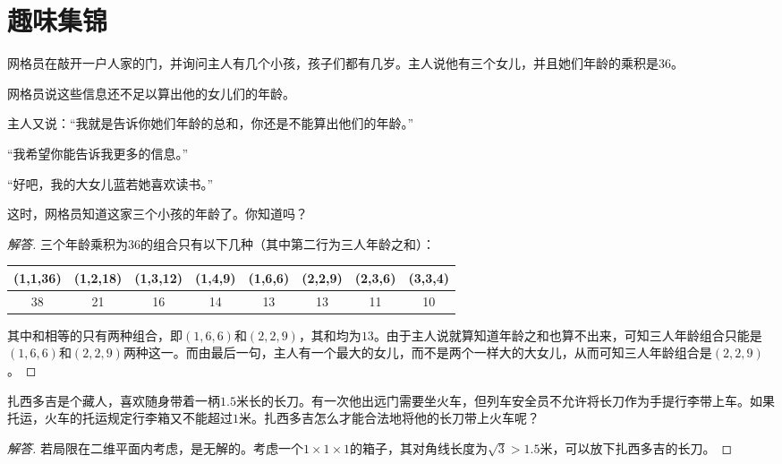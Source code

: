
\chapter{趣味集锦}
\label{chap:fun}

\begin{example}[户口调查员]
  网格员在敲开一户人家的门，并询问主人有几个小孩，孩子们都有几岁。主人说他有三个女儿，并且她们年龄的乘积是$36$。

  网格员说这些信息还不足以算出他的女儿们的年龄。

  主人又说：“我就是告诉你她们年龄的总和，你还是不能算出他们的年龄。”

  “我希望你能告诉我更多的信息。”

  “好吧，我的大女儿蓝若她喜欢读书。”

  这时，网格员知道这家三个小孩的年龄了。你知道吗？
\end{example}
\begin{proof}[解答]
  三个年龄乘积为$36$的组合只有以下几种（其中第二行为三人年龄之和）：

\begin{center}
\begin{tabular}{cccccccc}
  \hline
  (1,1,36) & (1,2,18) & (1,3,12) & (1,4,9) & (1,6,6) & (2,2,9) & (2,3,6) & (3,3,4)\\
  \hline
  38       & 21       & 16       & 14      & 13      & 13      & 11      & 10\\
  \hline
\end{tabular}
\end{center}

其中和相等的只有两种组合，即$(1,6,6)$和$(2,2,9)$，其和均为$13$。由于主人说就算知道年龄之和也算不出来，可知三人年龄组合只能是$(1,6,6)$和$(2,2,9)$两种这一。而由最后一句，主人有一个最大的女儿，而不是两个一样大的大女儿，从而可知三人年龄组合是$(2,2,9)$。
\end{proof}



\begin{example}
  扎西多吉是个藏人，喜欢随身带着一柄$1.5$米长的长刀。有一次他出远门需要坐火车，但列车安全员不允许将长刀作为手提行李带上车。如果托运，火车的托运规定行李箱又不能超过$1$米。扎西多吉怎么才能合法地将他的长刀带上火车呢？
\end{example}
\begin{proof}[解答]
若局限在二维平面内考虑，是无解的。考虑一个$1\times1\times1$的箱子，其对角线长度为$\sqrt3>1.5$米，可以放下扎西多吉的长刀。
\end{proof}
